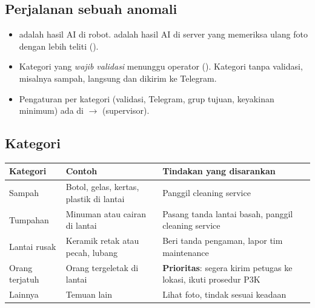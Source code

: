 \documentclass[11pt]{article}
\newcommand{\ra}{\ensuremath{\rightarrow}}
\begin{document}
\subsection{Perjalanan sebuah anomali}
\begin{center}
\end{center}
\begin{itemize}
  \item {} adalah hasil AI di robot.  adalah hasil AI di server yang
        memeriksa ulang foto dengan lebih teliti ().
  \item Kategori yang \emph{wajib validasi} menunggu operator (). Kategori tanpa
        validasi, misalnya sampah, langsung  dan dikirim ke Telegram.
  \item Pengaturan per kategori (validasi, Telegram, grup tujuan, keyakinan minimum) ada di
         \ra{}  (supervisor).
\end{itemize}

\subsection{Kategori}
\begin{tabularx}{\linewidth}{@{}B{3.0cm}YY@{}}
\toprule
Kategori & Contoh & Tindakan yang disarankan \\
\midrule
Sampah & Botol, gelas, kertas, plastik di lantai & Panggil cleaning service \\
Tumpahan & Minuman atau cairan di lantai & Pasang tanda lantai basah, panggil cleaning service \\
Lantai rusak & Keramik retak atau pecah, lubang & Beri tanda pengaman, lapor tim maintenance \\
\textcolor{dangerc}{Orang terjatuh} & Orang tergeletak di lantai & \textbf{Prioritas}: segera kirim petugas ke lokasi, ikuti prosedur P3K \\
Lainnya & Temuan lain & Lihat foto, tindak sesuai keadaan \\
\bottomrule
\end{tabularx}
\end{document}
